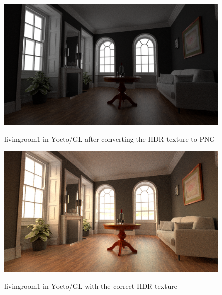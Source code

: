 \documentclass[12pt]{report}
\begin{document}
    \begin{figure}[h]
        \caption{livingroom1 in Yocto/GL after converting the HDR texture to PNG}
        \includegraphics[width=\textwidth]{images/yocto_livingroom1_path_png}
        \centering
        \label{fig:livingroom1_yocto_png}
    \end{figure}
    \begin{figure}[h]
        \caption{livingroom1 in Yocto/GL with the correct HDR texture}
        \includegraphics[width=\textwidth]{images/yocto_livingroom1_path}
        \centering
        \label{fig:livingroom1_yocto}
    \end{figure}
\end{document}
